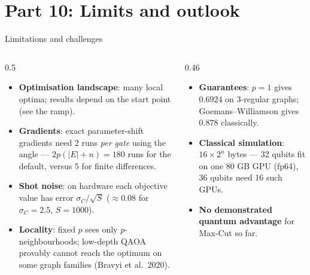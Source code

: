 \documentclass[aspectratio=169,11pt]{beamer}
\newcommand{\key}[1]{{\color{qdark}\textbf{#1}}}
\begin{document}
\section{Part 10: Limits and outlook}
\begin{frame}{Limitations and challenges}
  \small
  \begin{columns}[T]
    \begin{column}{0.5\textwidth}
      \begin{itemize}
        \item \key{Optimisation landscape}: many local optima; results depend on the start point (see the ramp).
        \item \key{Gradients}: exact parameter-shift gradients need 2 runs \emph{per gate} using the angle ---
          $2p(|E| + n) = 180$ runs for the default, versus $5$ for finite differences.
        \item \key{Shot noise}: on hardware each objective value has error $\sigma_C/\sqrt S$ ($\approx 0.08$ for $\sigma_C = 2.5$, $S = 1000$).
        \item \key{Locality}: fixed $p$ sees only $p$-neighbourhoods; low-depth QAOA provably cannot reach the optimum on some graph families (Bravyi et al.\ 2020).
      \end{itemize}
    \end{column}
    \begin{column}{0.46\textwidth}
      \begin{itemize}
        \item \key{Guarantees}: $p = 1$ gives $0.6924$ on 3-regular graphs; Goemans--Williamson gives $0.878$ classically.
        \item \key{Classical simulation}: $16\times2^n$ bytes --- 32 qubits fit on one 80 GB GPU (fp64), 36 qubits need 16 such GPUs.
        \item \key{No demonstrated quantum advantage} for Max-Cut so far.
      \end{itemize}
    \end{column}
  \end{columns}
\end{frame}
\end{document}
